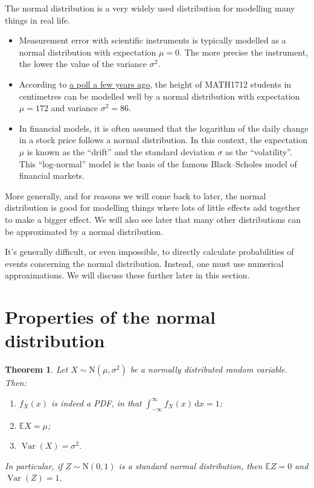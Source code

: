 \documentclass[
  a4paper,
]{book}
\providecommand{\tightlist}{%
  \setlength{\itemsep}{0pt}\setlength{\parskip}{0pt}}
\newtheorem{theorem}{Theorem}[chapter]
\theoremstyle{definition}
\theoremstyle{definition}
\theoremstyle{definition}
\theoremstyle{definition}
\theoremstyle{remark}
\begin{document}
The normal distribution is a very widely used distribution for modelling many things in real life.

\begin{itemize}
\tightlist
\item
  Measurement error with scientific instruments is typically modelled as a normal distribution with expectation \(\mu = 0\). The more precise the instrument, the lower the value of the variance \(\sigma^2\).
\item
  According to \href{http://www1.maths.leeds.ac.uk/~voss/2019/MATH1712/index.html}{a poll a few years ago}, the height of MATH1712 students in centimetres can be modelled well by a normal distribution with expectation \(\mu = 172\) and variance \(\sigma^2 = 86\).
\item
  In financial models, it is often assumed that the logarithm of the daily change in a stock price follows a normal distribution. In this context, the expectation \(\mu\) is known as the ``drift'' and the standard deviation \(\sigma\) as the ``volatility''. This ``log-normal'' model is the basis of the famous Black--Scholes model of financial markets.
\end{itemize}

More generally, and for reasons we will come back to later, the normal distribution is good for modelling things where lots of little effects add together to make a bigger effect. We will also see later that many other distributions can be approximated by a normal distribution.

It's generally difficult, or even impossible, to directly calculate probabilities of events concerning the normal distribution. Instead, one must use numerical approximations. We will discuss these further later in this section.

\hypertarget{normal-properties}{%
\section{Properties of the normal distribution}\label{normal-properties}}

\begin{theorem}
\protect\hypertarget{thm:norm-prop}{}\label{thm:norm-prop}Let \(X \sim \mathrm{N}(\mu, \sigma^2)\) be a normally distributed random variable. Then:

\begin{enumerate}
\def\labelenumi{\arabic{enumi}.}
\tightlist
\item
  \(f_X(x)\) is indeed a PDF, in that \(\displaystyle\int_{-\infty}^\infty f_X(x)\,\mathrm dx = 1\);
\item
  \(\mathbb EX = \mu\);
\item
  \(\operatorname{Var}(X) = \sigma^2\).
\end{enumerate}

In particular, if \(Z \sim \mathrm{N}(0, 1)\) is a standard normal distribution, then \(\mathbb EZ = 0\) and \(\operatorname{Var}(Z) = 1\).
\end{theorem}
\end{document}
